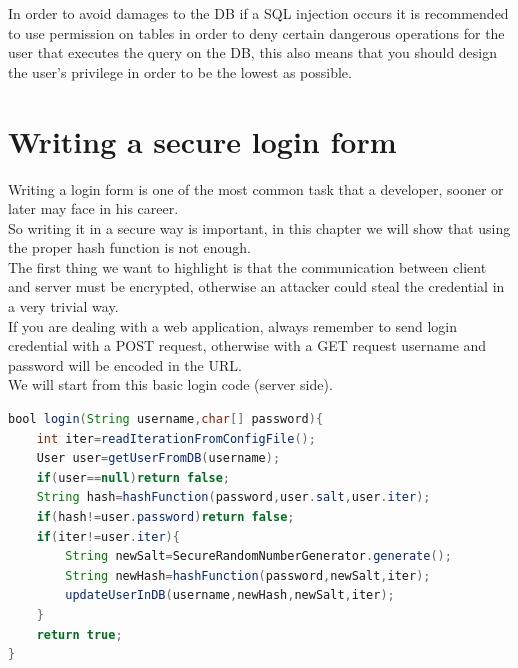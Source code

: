 In order to avoid damages to the DB if a SQL injection occurs it is recommended to use permission on tables in order to deny certain dangerous operations
for the user that executes the query on the DB, this also means that you should design the user's privilege in order to be the lowest as possible.\\ 


\section{Writing a secure login form}
Writing a login form is one of the most common task that a developer, sooner or later may face in his career.\\
So writing it in a secure way is important, in this chapter we will show that using the proper hash function is not enough.\\
The first thing we want to highlight is that the communication between client and server must be encrypted, otherwise an attacker could steal the credential in a very trivial way.\\
If you are dealing with a web application, always remember to send login credential with a POST request, otherwise with a GET request username and password will be encoded in the URL.\\
We will start from this basic login code (server side).\\
\begin{lstlisting}[language=Java]
bool login(String username,char[] password){
	int iter=readIterationFromConfigFile();
	User user=getUserFromDB(username);
	if(user==null)return false;
	String hash=hashFunction(password,user.salt,user.iter);
	if(hash!=user.password)return false;
	if(iter!=user.iter){
		String newSalt=SecureRandomNumberGenerator.generate();
		String newHash=hashFunction(password,newSalt,iter);
		updateUserInDB(username,newHash,newSalt,iter);
	}
	return true;
}
\end{lstlisting}



